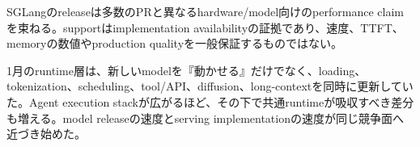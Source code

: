 \begin{claimboundary}
SGLangのreleaseは多数のPRと異なるhardware/model向けのperformance claimを束ねる。supportはimplementation availabilityの証拠であり、速度、TTFT、memoryの数値やproduction qualityを一般保証するものではない。\autocite{src-6a97353d35a9}
\end{claimboundary}

1月のruntime層は、新しいmodelを『動かせる』だけでなく、loading、tokenization、scheduling、tool/API、diffusion、long-contextを同時に更新していた。Agent execution stackが広がるほど、その下で共通runtimeが吸収すべき差分も増える。model releaseの速度とserving implementationの速度が同じ競争面へ近づき始めた。\autocite{src-152188dd686e,src-3bc80a3c7870,src-6a97353d35a9,src-d9f9de620203}

